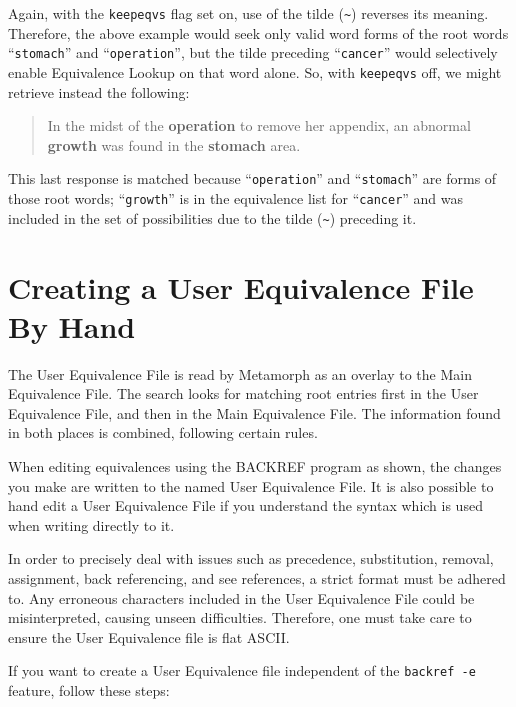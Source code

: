 Again, with the \verb`keepeqvs` flag set on, use of the tilde
(\verb`~`) reverses its meaning.  Therefore, the above example would
seek only valid word forms of the root words ``\verb`stomach`'' and
``\verb`operation`'', but the tilde preceding ``\verb`cancer`'' would
selectively enable Equivalence Lookup on that word alone.  So, with
\verb`keepeqvs` off, we might retrieve instead the following:

\begin{quote}
      In the midst of the {\bf operation} to remove her appendix, an abnormal
      {\bf growth} was found in the {\bf stomach} area.
\end{quote}

This last response is matched because ``\verb`operation`'' and
``\verb`stomach`'' are forms of those root words; ``\verb`growth`'' is
in the equivalence list for ``\verb`cancer`'' and was included in the
set of possibilities due to the tilde (\verb`~`) preceding it.

\section{Creating a User Equivalence File By Hand}

The User Equivalence File is read by Metamorph as an overlay to the
Main Equivalence File.  The search looks for matching root entries
first in the User Equivalence File, and then in the Main Equivalence
File.  The information found in both places is combined, following
certain rules.

When editing equivalences using the BACKREF program as shown, the
changes you make are written to the named User Equivalence File.  It
is also possible to hand edit a User Equivalence File if you
understand the syntax which is used when writing directly to it.

In order to precisely deal with issues such as precedence,
substitution, removal, assignment, back referencing, and see
references, a strict format must be adhered to.  Any erroneous
characters included in the User Equivalence File could be
misinterpreted, causing unseen difficulties.  Therefore, one must take
care to ensure the User Equivalence file is flat ASCII.

If you want to create a User Equivalence file independent of
the \verb`backref -e` feature, follow these steps:

